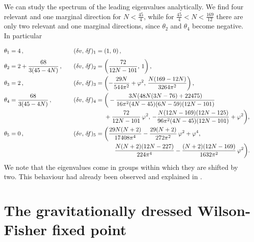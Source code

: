 \documentclass[11pt]{book} %
\begin{document}
We can study the spectrum of the leading eigenvalues analytically.
We find four relevant and one marginal direction for $N<\frac{45}{4}$,
while for $\frac{45}{4}<N<\frac{169}{12}$ there are only two relevant and one marginal directions,
since $\theta_2$ and $\theta_4$ become negative. In particular
\begin{alignat}{2}
  \theta_1 &= 4 \,,                                   && (\delta v, \, \delta\! f)_1 = \vphantom{\frac 11} (1, \, 0) \,, \nonumber \\
  \theta_2 &= 2 + \frac{68}{ 3 (45 - 4N) } \,, \quad  && (\delta v, \, \delta\! f)_2 = \left( \frac{72}{12 N - 101}, \, 1 \right)  , \nonumber\\
  \theta_3 &= 2 \,,                                   && (\delta v, \, \delta\! f)_3 = \left( -\frac{29 N}{544\pi^2} + \varphi^2, \, \frac{N(169 - 12 N)}{3264\pi^2}\right) , \nonumber\\
  \theta_4 &= \frac{68}{ 3 (45 - 4N) } \,,            && (\delta v, \, \delta\! f)_4 = \bigg( -\frac{3N(48N(3 N - 76)+22475)}{16\pi^2(4N - 45)(6N - 59) (12N - 101)} \nonumber \\
                                                    & && \hspace{1.8cm} + \frac{72}{12N - 101} \, \varphi^2, \,  - \frac{N(12N - 169)(12N-125)} {96\pi^2(4N - 45)(12 N - 101)}+\varphi^2\bigg) , \nonumber \\
  \theta_5 &= 0 \,,                                   && (\delta v, \, \delta\! f)_5 = \bigg( \frac{29 N (N+2)}{17408\pi^4} - \frac{29(N+2)}{272\pi ^2} \, \varphi^2 + \varphi^4, \nonumber \\
                                                    & && \hspace{2.4cm} \frac{N (N+2) (12 N - 227)}{224\pi ^4}-\frac{(N+2) (12 N - 169) }{1632\pi^2} \, \varphi^2 \bigg) .
\end{alignat}
We note that the eigenvalues come in groups
within which they are shifted by two.
This behaviour had already been observed and
explained in \cite{Narain:2009fy}.


\section{The gravitationally dressed Wilson-Fisher fixed point}
\end{document}
